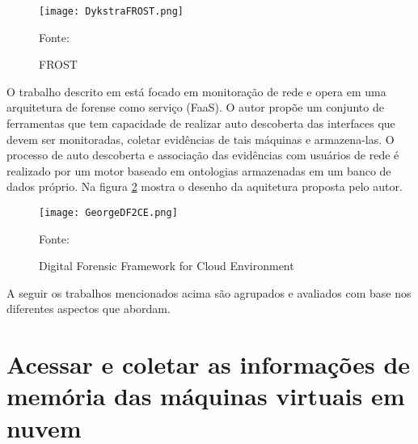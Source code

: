 \begin{figure}[htb!]
\footnotesize
\caption{FROST}
\texttt{[image: DykstraFROST.png]}
\centering
\label{fig:DykstraFROST}
\begin{center}
Fonte: \cite{DykstraFROST:2013} 
\end{center}
\end{figure}
%

O trabalho descrito em \cite{GeorgeDF2CE:2012} está focado em monitoração de rede e opera em uma arquitetura de forense como serviço (FaaS). 
%
O autor propõe um conjunto de ferramentas que tem capacidade de realizar auto descoberta das interfaces que devem ser monitoradas, coletar evidências de tais máquinas e armazena-las.
%
O processo de auto descoberta e associação das evidências com usuários de rede é realizado por um motor baseado em ontologias armazenadas em um banco de dados próprio.
%
Na figura \ref{fig:GeorgeDF2CE} mostra o desenho da aquitetura proposta pelo autor.

\begin{figure}[htb!]
\footnotesize
\caption{Digital Forensic Framework for Cloud Environment}
\texttt{[image: GeorgeDF2CE.png]}
\centering
\label{fig:GeorgeDF2CE}
\begin{center}
Fonte: \cite{GeorgeDF2CE:2012} 
\end{center}
\end{figure}

A seguir os trabalhos mencionados acima são agrupados e avaliados com base nos diferentes aspectos que abordam.

\section{Acessar e coletar as informações de memória das máquinas virtuais em nuvem}
\label{sec:coletadeevidencia}

